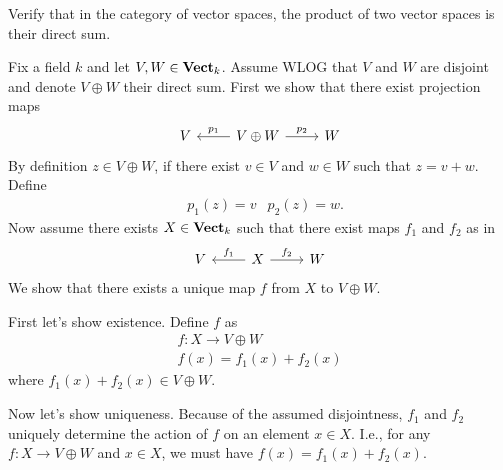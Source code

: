 \documentclass[11pt,a4paper]{article}
\begin{document}
\begin{exercise}
    Verify that in the category of vector spaces, the product of two vector spaces is their direct sum.
\end{exercise}
\begin{solution}
    Fix a field $k$ and let $V,W\in\mathbf{Vect}_k$. Assume WLOG that $V$ and $W$ are disjoint and denote $V\oplus W$ their direct sum. First we show that there exist projection maps
    \begin{equation*}
    \begin{tikzcd}
        V & V\oplus W \arrow[l, "p_1"'] \arrow[r, "p_2"] & W
    \end{tikzcd}
    \end{equation*}
    By definition $z\in V\oplus W$, if there exist $v\in V$ and $w\in W$ such that $z=v+w$. Define
    \begin{align*}
        &p_1(z)=v &p_2(z)=w.
    \end{align*}
    Now assume there exists $X\in\mathbf{Vect}_k$ such that there exist maps $f_1$ and $f_2$ as in
    \begin{equation*}
    \begin{tikzcd}
        V & X \arrow[l, "f_1"'] \arrow[r, "f_2"] & W
    \end{tikzcd}
    \end{equation*}
    We show that there exists a unique map $f$ from $X$ to $V\oplus W$.\par
    First let's show existence. Define $f$ as
    \begin{align*}
        f: X\to V\oplus W\\
        f(x) = f_1(x) + f_2(x)
    \end{align*}
    where $f_1(x) + f_2(x)\in V\oplus W$.\par
    Now let's show uniqueness. Because of the assumed disjointness, $f_1$ and $f_2$ uniquely determine the action of $f$ on an element $x\in X$. I.e., for any $f:X\to V\oplus W$ and $x\in X$, we must have $f(x)=f_1(x) + f_2(x)$.
\end{solution}
\end{document}
